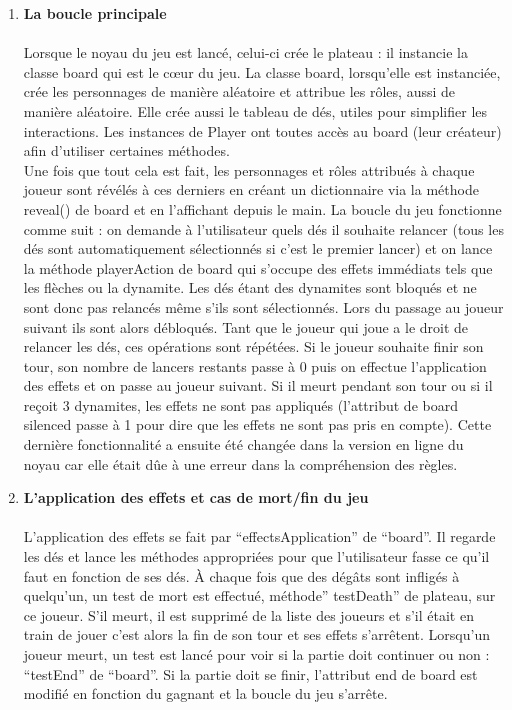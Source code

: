 \documentclass[a4paper,11pt]{article}
\begin{document}
\begin{enumerate}
	\item \textbf{La boucle principale} \\\\
	Lorsque le noyau du jeu est lancé, celui-ci crée le plateau : il instancie la classe board qui est le cœur du jeu. La classe board, lorsqu’elle est instanciée, crée les personnages de manière aléatoire et attribue les rôles, aussi de manière aléatoire. Elle crée aussi le tableau de dés, utiles pour simplifier les interactions. Les instances de Player ont toutes accès au board (leur créateur) afin d’utiliser certaines méthodes.  \\
Une fois que tout cela est fait, les personnages et rôles attribués à chaque joueur sont révélés à ces derniers en créant un dictionnaire via la méthode reveal() de board et en l’affichant depuis le main. La boucle du jeu fonctionne comme suit : on demande à l’utilisateur quels dés il souhaite relancer (tous les dés sont automatiquement sélectionnés si c’est le premier lancer) et on lance la méthode playerAction de board qui s’occupe des effets immédiats tels que les flèches ou la dynamite. Les dés étant des dynamites sont bloqués et ne sont donc pas relancés même s’ils sont sélectionnés. Lors du passage au joueur suivant ils sont alors débloqués. Tant que le joueur qui joue a le droit de relancer les dés, ces opérations sont répétées. Si le joueur souhaite finir son tour, son nombre de lancers restants passe à 0 puis on effectue l’application des effets et on passe au joueur suivant. Si il meurt pendant son tour ou si il reçoit 3 dynamites, les effets ne sont pas appliqués (l’attribut de board silenced passe à 1 pour dire que les effets ne sont pas pris en compte). Cette dernière fonctionnalité a ensuite été changée dans la version en ligne du noyau car elle était dûe à une erreur dans la compréhension des règles. \\

\newpage

	\item \textbf{L’application des effets et cas de mort/fin du jeu} \\\\
	L’application des effets se fait par “effectsApplication” de “board”. Il regarde les dés et lance les méthodes appropriées pour que l’utilisateur fasse ce qu’il faut en fonction de ses dés. À chaque fois que des dégâts sont infligés à quelqu’un, un test de mort est effectué, méthode” testDeath” de plateau, sur ce joueur. S’il meurt, il est supprimé de la liste des joueurs et s’il était en train de jouer c’est alors la fin de son tour et ses effets s’arrêtent. Lorsqu’un joueur meurt, un test est lancé pour voir si la partie doit continuer ou non : “testEnd” de “board”. Si la partie doit se finir, l’attribut end de board est modifié en fonction du gagnant et la boucle du jeu s’arrête. \\




\end{enumerate}
\end{document}
